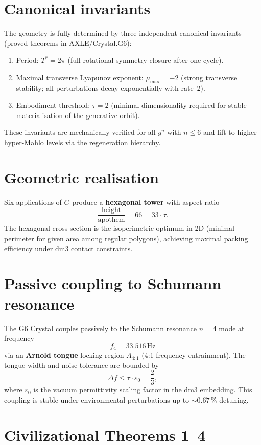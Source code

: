 \section{Canonical invariants}

The geometry is fully determined by three independent canonical invariants (proved theorems in AXLE/Crystal.G6):
\begin{enumerate}
\item Period: $T^* = 2\pi$ (full rotational symmetry closure after one cycle).
\item Maximal transverse Lyapunov exponent: $\mu_{\max} = -2$ (strong transverse stability; all perturbations decay exponentially with rate~2).
\item Embodiment threshold: $\tau = 2$ (minimal dimensionality required for stable materialisation of the generative orbit).
\end{enumerate}

These invariants are mechanically verified for all $g^n$ with $n \le 6$ and lift to higher hyper-Mahlo levels via the regeneration hierarchy.

\section{Geometric realisation}

Six applications of $G$ produce a \textbf{hexagonal tower} with aspect ratio
\[
\frac{\text{height}}{\text{apothem}} = 66 = 33 \cdot \tau.
\]
The hexagonal cross-section is the isoperimetric optimum in 2D (minimal perimeter for given area among regular polygons), achieving maximal packing efficiency under dm3 contact constraints.

\section{Passive coupling to Schumann resonance}

The G6 Crystal couples passively to the Schumann resonance $n=4$ mode at frequency
\[
f_4 = 33.516\,\text{Hz}
\]
via an \textbf{Arnold tongue} locking region $A_{4:1}$ (4:1 frequency entrainment). The tongue width and noise tolerance are bounded by
\[
\Delta f \le \tau \cdot \varepsilon_0 = \frac{2}{3},
\]
where $\varepsilon_0$ is the vacuum permittivity scaling factor in the dm3 embedding. This coupling is stable under environmental perturbations up to $\sim 0.67\,\%$ detuning.

\section{Civilizational Theorems 1--4}

